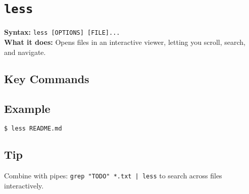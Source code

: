 \documentclass[10pt,oneside]{scrbook}
\begin{document}
\section{\texttt{less}}
\begin{cmdbox}
  \textbf{Syntax:} \lstinline!less [OPTIONS] [FILE]...! \\
  \textbf{What it does:} Opens files in an interactive viewer, letting you scroll, search, and navigate.
\end{cmdbox}
\begin{commanddetails}
  \subsection*{Key Commands}

  \subsection*{Example}
  \begin{lstlisting}[language=bash]
$ less README.md
  \end{lstlisting}

  \subsection*{Tip}
  Combine with pipes: \lstinline!grep "TODO" *.txt | less! to search across files interactively.
\end{commanddetails}

\end{document}

